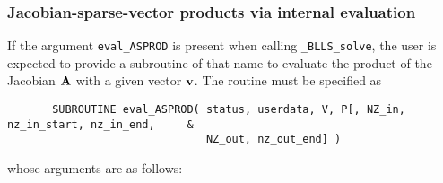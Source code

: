 \documentclass{galahad}
\newcommand{\packagename}{BLLS}
\newcommand{\fullpackagename}{\libraryname\_\packagename}
\newcommand{\solver}{{\tt \fullpackagename\_solve}}
\begin{document}

\subsubsection{Jacobian-sparse-vector products via internal evaluation\label{jvps}}

If the argument {\tt eval\_ASPROD} is present when calling \solver, the
user is expected to provide a subroutine of that name to evaluate the
product of the Jacobian ${\mathbf{A}}$ with a given vector ${\mathbf{v}}$.
The routine must be specified as

\def\baselinestretch{0.8}
{\tt \begin{verbatim}
       SUBROUTINE eval_ASPROD( status, userdata, V, P[, NZ_in, nz_in_start, nz_in_end,     &
                               NZ_out, nz_out_end] )
\end{verbatim} }
\def\baselinestretch{1.0}
\noindent whose arguments are as follows:
\end{document}
